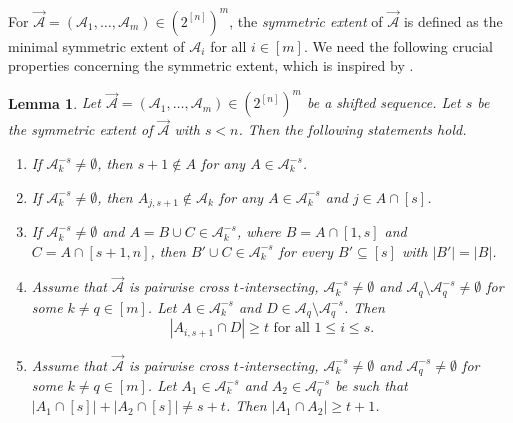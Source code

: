 \documentclass[11pt,a4paper]{article}
\newtheorem{lemma}[theorem]{Lemma}
\begin{document}
 For \(\vec{\mathcal{A}} = (\mathcal{A}_1, \ldots, \mathcal{A}_m) \in (2^{[n]})^{m} \), the \textit{symmetric extent} of $\vec{\mathcal{A}}$ is defined as the minimal symmetric extent of $\mathcal{A}_i$ for all $i\in[m]$. 
We need the following crucial properties concerning the symmetric extent, which is inspired by \cite[Lemma 2]{AK1999}.

\begin{lemma}\label{le3}
Let $\vec{\mathcal{A}} = (\mathcal{A}_1, \ldots, \mathcal{A}_m) \in (2^{[n]})^{m}$ be  a shifted  sequence. Let $s$ be the symmetric extent of $\vec{\mathcal{A}}$ with $s<n$. 
Then the following statements hold.
\begin{enumerate}
    \item[(1)] If  $\mathcal{A}_k^{-s}\neq \emptyset$, then $s + 1 \notin A$ for any $A \in \mathcal{A}_k^{-s}$.
    
    \item[(2)] If  $\mathcal{A}_k^{-s}\neq \emptyset$, then  $A_{j,s+1} \notin \mathcal{A}_k$ for any $A \in \mathcal{A}_k^{-s}$ and $j \in A\cap [s]$.
    
    \item[(3)] If  $\mathcal{A}_k^{-s}\neq \emptyset$ and $A= B \cup C \in \mathcal{A}_k^{-s}$, where $B = A \cap [1,s]$ and $C = A \cap [s+ 1,n]$,
then $B' \cup C \in \mathcal{A}_k^{-s}$ for every $B' \subseteq [s]$ with $|B'| = |B|$.
    
    \item[(4)]  Assume that $\vec{\mathcal{A}}$ is pairwise cross $t$-intersecting,  $\mathcal{A}_k^{-s}\neq \emptyset$ and $ \mathcal{A}_q \setminus \mathcal{A}_q^{-s}\neq \emptyset$ for some $k\neq q \in [m]$. Let $A \in \mathcal{A}_k^{-s}$ and $D \in \mathcal{A}_q \setminus \mathcal{A}_q^{-s}$. Then
    \[ |A_{i,s+1} \cap D| \geq  t \text{ for all } 1 \leq i \leq s. \]
 


  
    \item[(5)]  Assume that $\vec{\mathcal{A}}$ is pairwise cross $t$-intersecting,  $\mathcal{A}_k^{-s}\neq \emptyset$ and $ \mathcal{A}_q^{-s}\neq \emptyset$ for some $k\neq q \in [m]$. Let $A_1\in \mathcal{A}_k^{-s}$ and $A_2\in \mathcal{A}_q^{-s}$ be such that $|A_1\cap [s]|+|A_2\cap [s]|\neq s+t$. Then $|A_1 \cap A_2| \geq  t + 1$.
\end{enumerate}

\end{lemma} 
\end{document}
